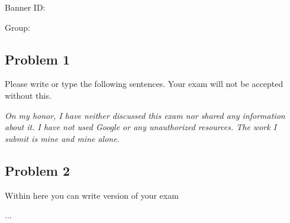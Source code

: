 Banner ID: \studentid

Group: 

\newpage

\subsection*{Problem 1}

Please write or type the following sentences. Your exam will not be accepted without this.

\emph{On my honor, I have neither discussed this exam nor shared any information about it.
I have not used Google or any unauthorized resources.
The work I submit is mine and mine alone.}

\subsection*{Problem 2}

Within here you can write  version of your exam 

 ...



